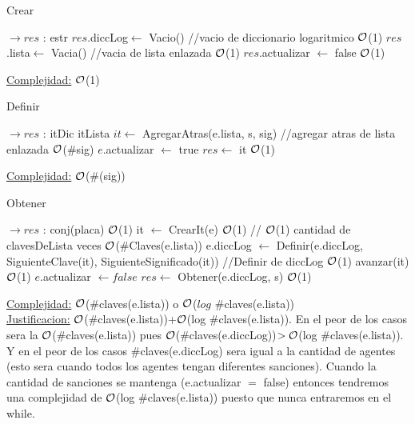\begin{Representacion}
\begin{Algoritmos}
	
	\begin{algorithm}[H]
		\caption{Crear}
		\begin{algorithmic}[1]
			 $\to res$ : estr
			\State $res$.diccLog$\leftarrow$ Vacio() //vacio de diccionario logaritmico \Comment $\mathcal{O}$(1)
			\State $res$.lista$\leftarrow$ Vacia() //vacia de lista enlazada \Comment $\mathcal{O}$(1)
			\State $res$.actualizar $\leftarrow$ false \Comment $\mathcal{O}$(1) 
			\EndProcedure
		\end{algorithmic}
		\underline{Complejidad:} $\mathcal{O}$(1)
	\end{algorithm}
	
	\begin{algorithm}[H]
		\caption{Definir}
		\begin{algorithmic}[1]
			 $\to res$ : itDic
			\State itLista $it \gets$ AgregarAtras(e.lista, s, sig) //agregar atras de lista enlazada \Comment $\mathcal{O}$($\#$sig)
			\State $e$.actualizar $\gets$ true
			\State $res \gets$ it \Comment $\mathcal{O}$(1)
			\EndProcedure
		\end{algorithmic}
		\underline{Complejidad:} $\mathcal{O}$($\#$(sig))
	\end{algorithm}

	\begin{algorithm}[H]
		\caption{Obtener}
		\begin{algorithmic}[1]
			 $\to res$ : conj(placa)
			 \Comment $\mathcal{O}$(1)
				\State it $\gets$ CrearIt(e) \Comment $\mathcal{O}$(1)
				 // $\mathcal{O}$(1) cantidad de clavesDeLista veces \Comment $\mathcal{O}$($\#$Claves(e.lista))
					\State e.diccLog $\gets$ Definir(e.diccLog, SiguienteClave(it), SiguienteSignificado(it)) //Definir de diccLog \Comment $\mathcal{O}$(1) 
					\State avanzar(it) \Comment $\mathcal{O}$(1) 
				\EndWhile
				\State $e$.actualizar $\gets false$
			\EndIf
			\State $res \gets$ Obtener(e.diccLog, s) \Comment $\mathcal{O}$(1)
			\EndProcedure
		\end{algorithmic}
		\underline{Complejidad:} $\mathcal{O}$($\#$claves(e.lista)) o $\mathcal{O}$($log$ $\#$claves(e.lista))\\
		\underline{Justificacion:} $\mathcal{O}$($\#$claves(e.lista))+$\mathcal{O}$(log $\#$claves(e.lista)). En el peor de los casos sera la $\mathcal{O}$($\#$claves(e.lista)) pues $\mathcal{O}$($\#$claves(e.diccLog))$>\mathcal{O}$(log $\#$claves(e.lista)). Y en el peor de los casos $\#$claves(e.diccLog) sera igual a la cantidad de agentes (esto sera cuando todos los agentes tengan diferentes sanciones). Cuando la cantidad de sanciones se mantenga (e.actualizar $=$ false) entonces tendremos una complejidad de $\mathcal{O}$(log $\#$claves(e.lista)) puesto que nunca entraremos en el while.
	\end{algorithm}	
	

\end{Algoritmos}
\end{Representacion}
